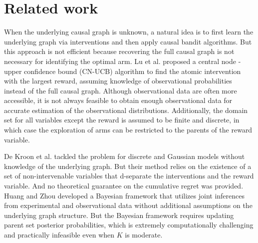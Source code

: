 \section{Related work}
When the underlying causal graph is unknown, a natural idea is to first learn the underlying graph via interventions and then apply causal bandit algorithms. But this approach is not efficient because recovering the full causal graph is not necessary for identifying the optimal arm. Lu et al. \cite{lu2021causal} proposed a central node - upper confidence bound (CN-UCB) algorithm to find the atomic intervention with the largest reward, assuming knowledge of observational probabilities instead of the full causal graph. Although observational data are often more accessible, %
it is not always feasible to obtain enough observational data for accurate estimation of the observational distributions. Additionally, the domain set for all variables except the reward is assumed to be finite and discrete, in which case the exploration of arms can be restricted to the parents of the reward variable.

De Kroon et al. \cite{dekroon2022causal} tackled the problem for discrete and Gaussian models without knowledge of the underlying graph. But their method relies on the existence of a set of non-intervenable variables that d-separate the interventions and the reward variable. And no theoretical guarantee on the cumulative regret was provided. Huang and Zhou \cite{Jireh2022BBB} developed a Bayesian framework that utilizes joint inferences from experimental %
and observational data without additional assumptions on the underlying graph structure. But the Bayesian framework requires updating parent set posterior probabilities, which is extremely computationally challenging and practically infeasible even when $K$ is moderate.